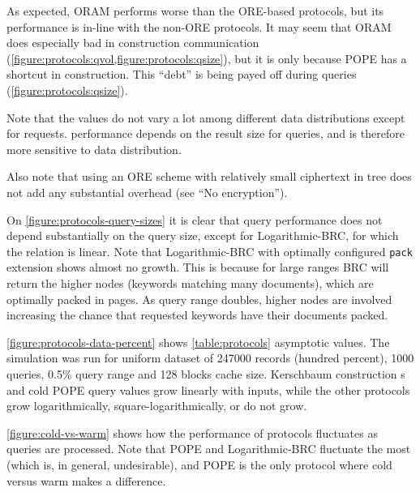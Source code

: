 			As expected, ORAM performs worse than the ORE-based protocols, but its performance is in-line with the non-ORE protocols.
			It may seem that ORAM does especially bad in construction communication (\cref{figure:protocols:qvol,figure:protocols:qsize}), but it is only because POPE has a shortcut in construction.
			This ``debt'' is being payed off during queries (\cref{figure:protocols:qsize}).

			Note that the values do not vary a lot among different data distributions except for {\IO} requests.
			{\IO} performance depends on the result size for queries, and is therefore more sensitive to data distribution.

			Also note that using an ORE scheme with relatively small ciphertext in {\BPlus} tree does not add any substantial {\IO} overhead (see ``No encryption'').

			On \cref{figure:protocols-query-sizes} it is clear that query performance does not depend substantially on the query size, except for Logarithmic\hyp{}BRC, for which the relation is linear.
			Note that Logarithmic\hyp{}BRC with optimally configured \texttt{pack} extension shows almost no growth.
			This is because for large ranges BRC will return the higher nodes (keywords matching many documents), which are optimally packed in {\IO} pages.
			As query range doubles, higher nodes are involved increasing the chance that requested keywords have their documents packed.

			

			\cref{figure:protocols-data-percent} shows \cref{table:protocols} asymptotic values.
			The simulation was run for uniform dataset of 247000 records (hundred percent), 1000 queries, 0.5\% query range and 128 blocks cache size.
			Kerschbaum construction {\IO}s and cold POPE query values grow linearly with inputs, while the other protocols grow logarithmically, square-logarithmically, or do not grow.

			\cref{figure:cold-vs-warm} shows how the performance of protocols fluctuates as queries are processed.
			Note that POPE and Logarithmic\hyp{}BRC fluctuate the most (which is, in general, undesirable), and POPE is the only protocol where cold versus warm makes a difference.
